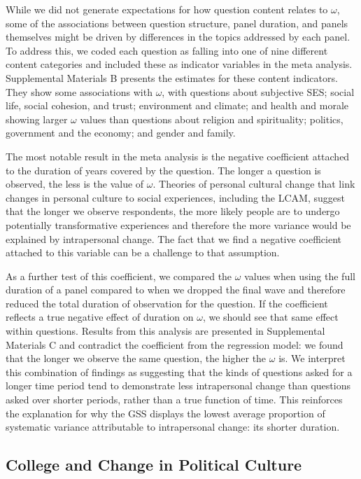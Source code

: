\documentclass[
  12pt,
]{article}
\begin{document}
While we did not generate expectations for how question content relates
to \(\omega\), some of the associations between question structure,
panel duration, and panels themselves might be driven by differences in
the topics addressed by each panel. To address this, we coded each
question as falling into one of nine different content categories and
included these as indicator variables in the meta analysis. Supplemental
Materials B presents the estimates for these content indicators. They
show some associations with \(\omega\), with questions about subjective
SES; social life, social cohesion, and trust; environment and climate;
and health and morale showing larger \(\omega\) values than questions
about religion and spirituality; politics, government and the economy;
and gender and family.

The most notable result in the meta analysis is the negative coefficient
attached to the duration of years covered by the question. The longer a
question is observed, the less is the value of \(\omega\). Theories of
personal cultural change that link changes in personal culture to social
experiences, including the LCAM, suggest that the longer we observe
respondents, the more likely people are to undergo potentially
transformative experiences and therefore the more variance would be
explained by intrapersonal change. The fact that we find a negative
coefficient attached to this variable can be a challenge to that
assumption.

As a further test of this coefficient, we compared the \(\omega\) values
when using the full duration of a panel compared to when we dropped the
final wave and therefore reduced the total duration of observation for
the question. If the coefficient reflects a true negative effect of
duration on \(\omega\), we should see that same effect within questions.
Results from this analysis are presented in Supplemental Materials C and
contradict the coefficient from the regression model: we found that the
longer we observe the same question, the higher the \(\omega\) is. We
interpret this combination of findings as suggesting that the kinds of
questions asked for a longer time period tend to demonstrate less
intrapersonal change than questions asked over shorter periods, rather
than a true function of time. This reinforces the explanation for why
the GSS displays the lowest average proportion of systematic variance
attributable to intrapersonal change: its shorter duration.

\hypertarget{college-and-change-in-political-culture}{%
\subsection{College and Change in Political
Culture}\label{college-and-change-in-political-culture}}
\end{document}

